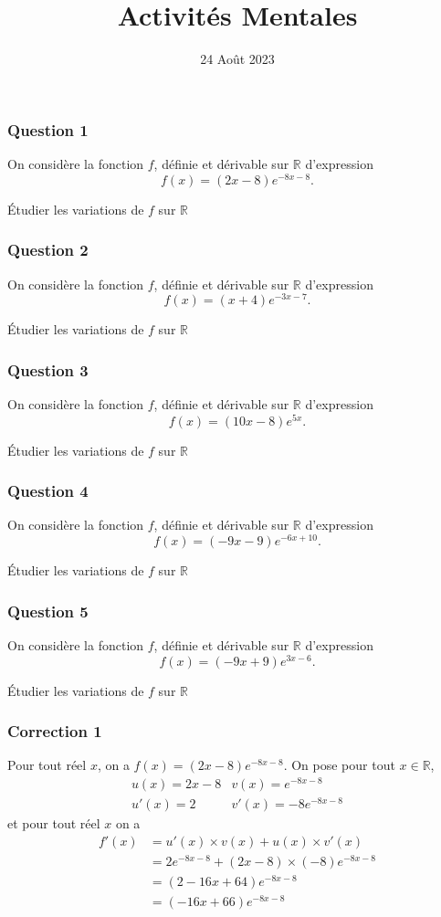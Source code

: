\documentclass[15pt, mathserif]{beamer}
\title{Activités Mentales}
\date{24 Août 2023}
\begin{document}
\begin{frame}
    \titlepage
\end{frame}

\begin{frame} 
	\frametitle{Question 1}
On considère la fonction $f$, définie et dérivable sur $\mathbb{R}$ d'expression \[f(x) = (2x-8)e^{-8x-8}.\]

Étudier les variations de $f$ sur $\mathbb{R}$\end{frame}


\begin{frame} 
	\frametitle{Question 2}
On considère la fonction $f$, définie et dérivable sur $\mathbb{R}$ d'expression \[f(x) = (x+4)e^{-3x-7}.\]

Étudier les variations de $f$ sur $\mathbb{R}$\end{frame}


\begin{frame} 
	\frametitle{Question 3}
On considère la fonction $f$, définie et dérivable sur $\mathbb{R}$ d'expression \[f(x) = (10x-8)e^{5x}.\]

Étudier les variations de $f$ sur $\mathbb{R}$\end{frame}


\begin{frame} 
	\frametitle{Question 4}
On considère la fonction $f$, définie et dérivable sur $\mathbb{R}$ d'expression \[f(x) = (-9x-9)e^{-6x+10}.\]

Étudier les variations de $f$ sur $\mathbb{R}$\end{frame}


\begin{frame} 
	\frametitle{Question 5}
On considère la fonction $f$, définie et dérivable sur $\mathbb{R}$ d'expression \[f(x) = (-9x+9)e^{3x-6}.\]

Étudier les variations de $f$ sur $\mathbb{R}$\end{frame}


\begin{frame}
\vspace{-10mm}
	\frametitle{Correction 1}
Pour tout réel $x$, on a $f(x) =(2x-8)e^{-8x-8}$. On pose pour tout $x \in \mathbb{R}$,\[\begin{matrix}u(x) = 2x-8& v(x) = e^{-8x-8}\\ u'(x) = 2& v'(x) = -8e^{-8x-8}\end{matrix}\]et pour tout réel $x$ on a \begin{align*}f'(x)&= u'(x) \times v(x) + u(x) \times v'(x) \\ &=2e^{-8x-8}+(2x-8)\times \left(-8\right) e^{-8x-8} \\
	 &= (2-16x+64)e^{-8x-8} \\
	 &= (-16x+66)e^{-8x-8}
\end{align*}

\end{frame}
\end{document}
